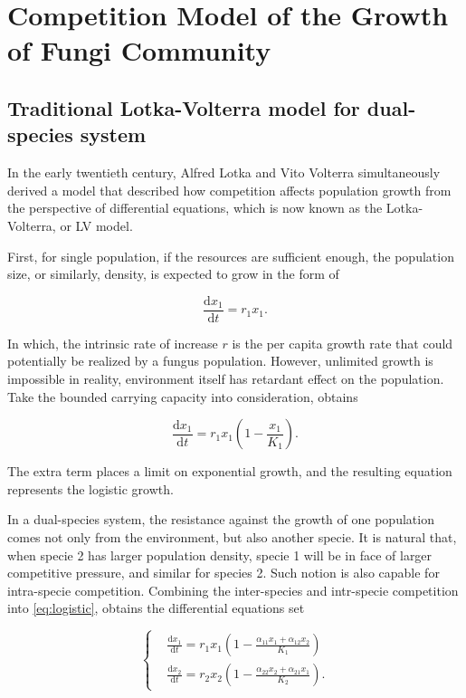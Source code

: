 \section{Competition Model of the Growth of Fungi Community}\label{sec:LV}


\subsection{Traditional Lotka-Volterra model for dual-species system}

In the early twentieth century, Alfred Lotka and Vito Volterra simultaneously derived a model that described how competition affects population growth from the perspective of differential equations, which is now known as the Lotka-Volterra, or LV model. \cite{LV-model}

First, for single population, if the resources are sufficient enough, the population size, or similarly, density, is expected to grow in the form of

\begin{equation}\label{eq:exp}
    \frac{\mathrm{d}x_1}{\mathrm{d}t} = r_1x_1.
\end{equation}

In which, the intrinsic rate of increase $r$ is the per capita growth rate that could potentially be realized by a fungus population. However, unlimited growth is impossible in reality, environment itself has retardant effect on the population. Take the bounded carrying capacity into consideration, obtains

\begin{equation}\label{eq:logistic}
    \frac{\mathrm{d}x_1}{\mathrm{d}t} =
    r_1x_1\left(1 - \frac{x_1}{K_1}\right).
\end{equation}

The extra term places a limit on exponential growth, and the resulting equation represents the logistic growth.

In a dual-species system, the resistance against the growth of one population comes not only from the environment, but also another specie. It is natural that, when specie 2 has larger population density, specie 1 will be in face of larger competitive pressure, and similar for species 2. Such notion is also capable for intra-specie competition. Combining the inter-species and intr-specie competition into \eqref{eq:logistic}, obtains the differential equations set

\begin{equation}\label{eq:lv-dual}
    \left\{\begin{aligned}     &
        \frac{\mathrm{d}x_1}{\mathrm{d}t} =
        r_1x_1\left(1 - \frac{\alpha_{11}x_1 + \alpha_{12}x_2}{K_1}\right) \\ &
        \frac{\mathrm{d}x_2}{\mathrm{d}t} =
        r_2x_2\left(1 - \frac{\alpha_{22}x_2 + \alpha_{21}x_1}{K_2}\right).
    \end{aligned}\right.
\end{equation}

